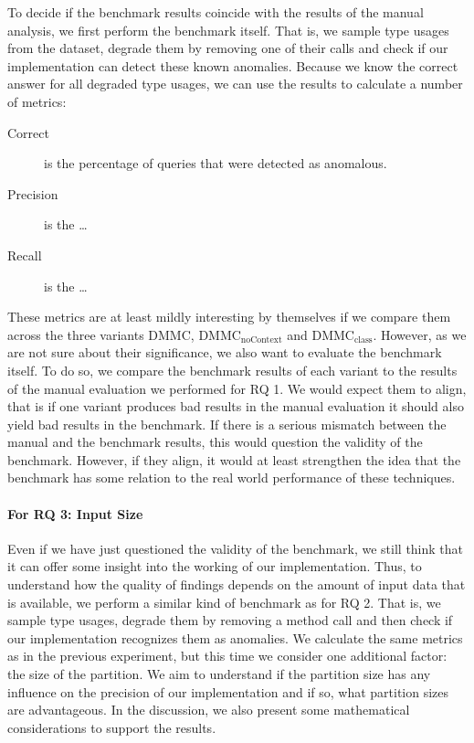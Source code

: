 To decide if the benchmark results coincide with the results of the manual analysis, we first perform the benchmark itself.
That is, we sample type usages from the dataset, degrade them by removing one of their calls and check if our implementation can detect these known anomalies.
Because we know the correct answer for all degraded type usages, we can use the results to calculate a number of metrics:
\begin{description}
    \item [Correct] is the percentage of queries that were detected as anomalous.
    \item [Precision] is the \ldots
    \item [Recall] is the \ldots
\end{description}
These metrics are at least mildly interesting by themselves if we compare them across the three variants $\text{DMMC}$, $\text{DMMC}_\text{noContext}$ and $\text{DMMC}_\text{class}$.
However, as we are not sure about their significance, we also want to evaluate the benchmark itself.
To do so, we compare the benchmark results of each variant to the results of the manual evaluation we performed for RQ 1.
We would expect them to align, that is if one variant produces bad results in the manual evaluation it should also yield bad results in the benchmark.
If there is a serious mismatch between the manual and the benchmark results, this would question the validity of the benchmark.
However, if they align, it would at least strengthen the idea that the benchmark has some relation to the real world performance of these techniques.


\paragraph{For RQ 3: Input Size}

Even if we have just questioned the validity of the benchmark, we still think that it can offer some insight into the working of our implementation.
Thus, to understand how the quality of findings depends on the amount of input data that is available, we perform a similar kind of benchmark as for RQ 2.
That is, we sample type usages, degrade them by removing a method call and then check if our implementation recognizes them as anomalies.
We calculate the same metrics as in the previous experiment, but this time we consider one additional factor: the size of the partition.
We aim to understand if the partition size has any influence on the precision of our implementation and if so, what partition sizes are advantageous.
In the discussion, we also present some mathematical considerations to support the results.
    

